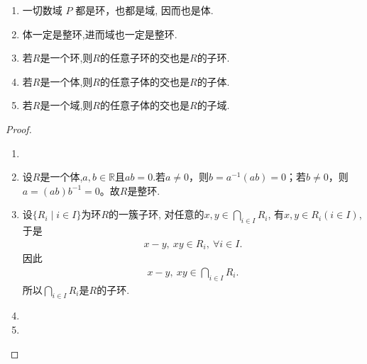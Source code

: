 \documentclass[../../main.tex]{subfiles}%
\begin{document}
\begin{proposition}\label{proposition:域和体的一些显然的性质}
\begin{enumerate}[(1)]
\item 一切数域 \( P \) 都是环，也都是域, 因而也是体.

\item\label{proposition:域和体的一些显然的性质-1} 体一定是整环,进而域也一定是整环.

\item\label{proposition:域和体的一些显然的性质-4} 若$R$是一个环,则$R$的任意子环的交也是$R$的子环.

\item\label{proposition:域和体的一些显然的性质-2} 若$R$是一个体,则$R$的任意子体的交也是$R$的子体.

\item\label{proposition:域和体的一些显然的性质-3} 若$R$是一个域,则$R$的任意子体的交也是$R$的子域.
\end{enumerate}
\end{proposition}
\begin{proof}
\begin{enumerate}[(1)]
\item 

\item 设$R$是一个体,$a,b\in \mathbb{R}$且$ab=0$.若$a\neq 0$，则$b=a^{-1}(ab)=0$；若$b\neq 0$，则$a=(ab)b^{-1}=0$。故$R$是整环.

\item 设$\{R_i \mid i \in I\}$为环$R$的一簇子环, 对任意的$x,y \in \bigcap_{i \in I}R_i$, 有$x,y \in R_i(i \in I)$, 于是
\begin{align*}
x - y,\ xy \in R_i,\ \forall i \in I.
\end{align*}
因此
\begin{align*}
x - y,\ xy \in \bigcap_{i \in I}R_i.
\end{align*}
所以$\bigcap_{i \in I}R_i$是$R$的子环.

\item 

\item 
\end{enumerate}

\end{proof}
\end{document}
